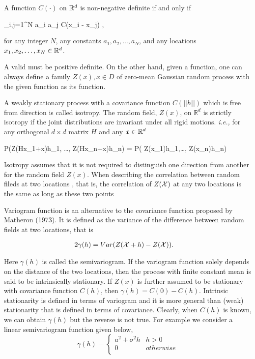 A function $C(\cdot)$ on $\mathbb{R}^d$ is non-negative definite if and only if

\beq 
\label{cov_pd}
\sum_{i,j=1}^{N} a_i a_j C(x_i - x_j) ,
\eeq

for any integer $N$, any constants $a_1, a_2, \ldots, a_N$, and any locations $x_1, x_2, \ldots, x_N \in \mathbb{R}^d$. 


A valid \cov must be positive definite. On the other hand, given a \pd function, one can always define a family $Z(x), x \in D$ of zero-mean Gaussian random process with the given function as its \cov function.

		
A weakly stationary process with a covariance function $C(||h||)$ which is free from direction is called isotropy. The random field, $Z(x)$, on $\mathbb{R}^d$ is strictly isotropy if the joint distributions are invariant under all rigid motions. {\em i.e.,} for any orthogonal $d\times d$ matrix $H$ and any $x\in \mathbb{R}^d$

\beq
P(Z(Hx_1+x)\le h_1, \ldots, Z(Hx_n+x)\le h_n) = P( Z(x_1)\le h_1,\ldots, Z(x_n)\le h_n)
\eeq

Isotropy assumes that it is not required to distinguish one direction from another for the random field $Z(x)$. When describing the correlation between random fileds at two locations , that is, the correlation of $Z(\mathcal{X})$ at any two locations is the same as long as these two points 

Variogram function is an alternative to the covariance function proposed by Matheron (1973). It is defined as the variance of the difference between random fields at two locations, that is

\begin{align}
	2\gamma(h) & = Var(Z(\mathcal{X}+h) -Z(\mathcal{X})).
\end{align}

Here $\gamma(h)$ is called the semivariogram. If the variogram function solely depends on the distance of the two locations, then the process with finite constant mean is said to be intrinsically stationary. If $Z(x)$ is further assumed to be stationary with covariance function $C(h)$, then $\gamma(h) = C(0) - C(h)$. Intrinsic stationarity is defined in terms of variogram and it is more general than (weak) stationarity that is defined in terms of covariance. Clearly, when $C(h)$ is known, we can obtain $\gamma(h)$ but the reverse is not true. For example we consider a linear semivariogram function given below,
\[
	\gamma(h) = \left \{ \begin{array}{cc}
	a^2+\sigma^2h & h>0 \\
	0 & otherwise \\
	\end{array}
	\right.
\]

